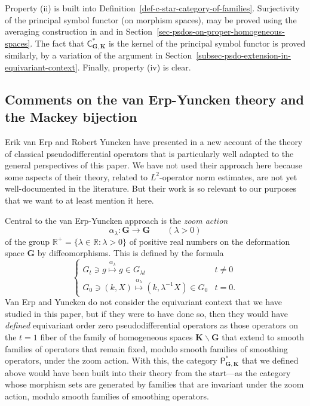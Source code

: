 \documentclass[leqno,11pt]{amsart}
\numberwithin{equation}{subsection}
\theoremstyle{plain}
\theoremstyle{definition}
\theoremstyle{remark}
\newcommand{\R}{\mathbb{R}}
\newcommand{\GG}{\pmb{G}}
\newcommand{\KK}{\pmb{K}}
\newcommand{\PSDO}{\mathsf{P}}
\newcommand{\CC}{\mathsf{C}}
\begin{document}
Property (ii) is built into Definition~\ref{def-c-star-category-of-families}. Surjectivity of the principal symbol functor (on morphism spaces), may be proved using the averaging construction  in \cite{Stetkaer71} and in Section~\ref{sec-psdos-on-proper-homogeneous-spaces}.  The fact that $\CC^*_{\GG,\KK}$ is the kernel of the principal symbol functor is proved similarly, by a variation of the argument in Section~\ref{subsec-psdo-extension-in-equivariant-context}.  Finally,
property (iv) is clear.

\subsection{Comments  on the van Erp-Yuncken theory and the Mackey bijection}
Erik van Erp and Robert Yuncken have presented in \cite{VanErpYuncken19} a new account of the theory of classical pseudodifferential operators that is particularly well adapted to the general perspectives of this paper. We have not used their approach here because some aspects of their theory, related to $L^2$-operator norm estimates, are not yet well-documented in the literature. But their work is so relevant to our purposes that we want to at least mention it here.


Central to the van Erp-Yuncken approach is the \emph{zoom action}
\[
\alpha_\lambda \colon \GG \longrightarrow \GG\qquad (\lambda > 0)
\]
of the group $\R^+=\{ \lambda \in \R : \lambda > 0\}$ of  positive real numbers  on the deformation space $\GG$ by diffeomorphisms. This is defined by the formula 
\[
\begin{cases}
G_t\ni g \stackrel {\alpha _\lambda} \longmapsto g\in G_{\lambda t} & t {\ne } 0
\\
G_0\ni (k,X) \stackrel {\alpha _\lambda} \longmapsto (k,\lambda ^{-1} X)\in G_{ 0} &  t{=}0 .
\end{cases}
\]
Van Erp and Yuncken do not consider the equivariant context that we have studied in this paper, but if they were to have done so, then they would have \emph{defined} equivariant order zero pseudodifferential operators as those operators on the $t{=}1$ fiber of the family of homogeneous spaces $\KK\backslash \GG$ that extend to smooth families of operators that remain fixed, modulo smooth families of smoothing operators, under the zoom action.  With this, the category $\PSDO^*_{\GG,\KK}$ that we defined above would have been built into their theory from the start---as the category whose morphism sets are generated by families that are invariant under the zoom action, modulo smooth families of smoothing operators. 
\end{document}
